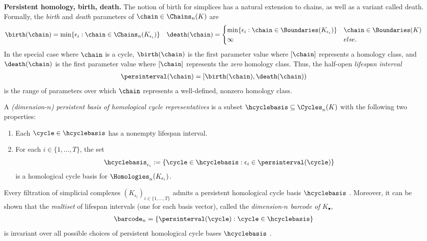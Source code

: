 \noindent \textbf{Persistent homology, birth, death.} The notion of birth for simplices has a natural extension to chains, as well as a variant called death.  Formally,  the \emph{birth} and \emph{death} parameters of  $\chain \in \Chains_n(K)$ are 
    \begin{align*}
    \birth(\chain) = \min \{\epsilon_i : \chain \in \Chains_n(K_{\epsilon_i}) \}
    &&
    \death(\chain) 
    = 
    \begin{cases}
    \min \{\epsilon_i : \chain \in \Boundaries(K_{\epsilon_i}) \} & \chain \in \Boundaries(K)
    \\
    \infty & else.
    \end{cases}
    \end{align*}
In the special case where $\chain$ is a cycle,  $\birth(\chain)$ is the first parameter value where $[\chain]$ represents a homology class, and $\death(\chain)$ is the first parameter value where $[\chain]$ represents the \emph{zero} homology class.   Thus, the half-open
\emph{lifespan interval} 
    \begin{align*}
        \persinterval(\chain) = [\birth(\chain), \death(\chain))
    \end{align*}
is the range of parameters over which $\chain$ represents a well-defined, nonzero homology class.

A \emph{(dimension-$n$) persistent basis of  homological cycle representatives} is a subset $\hcyclebasis \subseteq \Cycles_n(K)$ with the following two properties:
    \begin{enumerate}
    \item Each $\cycle \in \hcyclebasis$ has a nonempty lifespan interval.
    \item For each $i \in \{1, \ldots, T\}$, the set 
        $$
        \hcyclebasis_{\epsilon_i} 
        := 
        \{\cycle \in \hcyclebasis : \epsilon_i \in \persinterval(\cycle) \}
        $$
    is a homological cycle basis for $\Homologies_n(K_{\epsilon_i})$.
    \end{enumerate}

Every filtration of simplicial complexes $ (K_{\epsilon_i})_{i \in\{ 1, \ldots, T\}}$ admits a  persistent homological cycle basis  $\hcyclebasis$ \cite{zomorodiancarlssoncomputingph}.  
Moreover, it can be shown that the \emph{multiset} of lifespan intervals (one for each basis vector), called the \emph{dimension-$n$ barcode of $K_\bullet$},
    \begin{align*}
        \barcode_n = 
        \{ \persinterval(\cycle) : \cycle \in \hcyclebasis \}
    \end{align*}
is invariant over all possible choices of persistent homological cycle bases $\hcyclebasis$ \cite{zomorodiancarlssoncomputingph}.  

